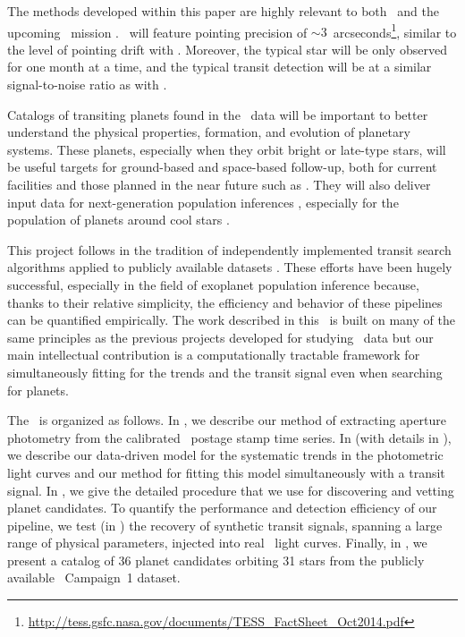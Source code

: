 The methods developed within this paper are highly relevant to both \KT\ and
the upcoming \tess\ mission \citep{Ricker:2014}.
\tess\ will feature pointing precision of $\sim
3$~arcseconds\footnote{\url{http://tess.gsfc.nasa.gov/documents/TESS_FactSheet_Oct2014.pdf}},
similar to the level of pointing drift with \KT.
Moreover, the typical star will be only observed for one month at a time, and
the typical transit detection will be at a similar signal-to-noise ratio as
with \KT.

Catalogs of transiting planets found in the \KT\ data will be important to
better understand the physical properties, formation, and evolution of
planetary systems.
These planets, especially when they orbit bright or late-type stars, will be
useful targets for ground-based and space-based follow-up, both for current
facilities and those planned in the near future such as \jwst.
They will also deliver input data for next-generation population inferences
\citep{Foreman-Mackey:2014}, especially for the population of planets around
cool stars \citep[for example,][]{Dressing:2015}.

This project follows in the tradition of independently implemented transit
search algorithms applied to publicly available datasets \citep[such
as][]{Petigura:2013a, Petigura:2013, Sanchis-Ojeda:2014, Dressing:2015}.
These efforts have been hugely successful, especially in the field of
exoplanet population inference because, thanks to their relative simplicity,
the efficiency and behavior of these pipelines can be quantified empirically.
The work described in this \paper\ is built on many of the same principles as
the previous projects developed for studying \kepler\ data but our main
intellectual contribution is a computationally tractable framework for
simultaneously fitting for the trends and the transit signal even when
searching for planets.

The \paper\ is organized as follows.
In , we describe our method of extracting aperture photometry from
the calibrated \KT\ postage stamp time series.
In  (with details in ), we describe our data-driven
model for the systematic trends in the photometric light curves and our method
for fitting this model simultaneously with a transit signal.
In , we give the detailed procedure that we use for discovering
and vetting planet candidates.
To quantify the performance and detection efficiency of our pipeline, we test
(in ) the recovery of synthetic transit
signals, spanning a large range of physical parameters, injected into real
\KT\ light curves.
Finally, in , we present a catalog of 36 planet candidates
orbiting 31 stars from the publicly available \KT\ Campaign~1 dataset.


